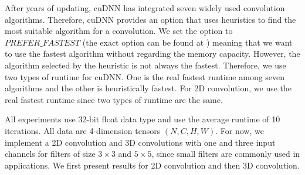 \documentclass[sigplan,review,anonymous]{acmart}\settopmatter{printfolios=true,printccs=false,printacmref=false}
\begin{document}
After years of updating, cuDNN has integrated seven widely used convolution algorithms. Therefore, cuDNN provides an option that uses heuristics to find the most suitable algorithm for a convolution. We set the option to $PREFER\_FASTEST$ (the exact option can be found at \cite{CUDAtoolkit}) meaning that we want to use the fastest algorithm without regarding the memory capacity. However, the algorithm selected by the heuristic is not always the fastest. Therefore, we use two types of runtime for cuDNN. One is the real fastest runtime among seven algorithms and the other is heuristically fastest. For 2D convolution, we use the real fastest runtime since two types of runtime are the same.

All experiments use 32-bit float data type and use the average runtime of 10 iterations. All data are 4-dimension tensors $(N,C,H,W)$. For now, we implement a 2D convolution and 3D convolutions with one and three input channels for filters of size $3 \times 3$ and $5 \times 5$, since small filters are commonly used in applications. We first present results for 2D convolution and then 3D convolution.
\end{document}
